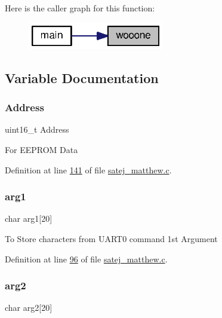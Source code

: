 Here is the caller graph for this function\+:
\nopagebreak
\begin{figure}[H]
\begin{center}
\leavevmode
\includegraphics[width=168pt]{satej__matthew_8c_a35d3aeb4661540f67e367e4e328c6c88_icgraph}
\end{center}
\end{figure}


\subsection{Variable Documentation}
\mbox{\label{satej__matthew_8c_a749532d9fcee171290bbfbe7859e6ba7}} 
\subsubsection{\texorpdfstring{Address}{Address}}
{\footnotesize\ttfamily uint16\+\_\+t Address}

For E\+E\+P\+R\+OM Data 

Definition at line \mbox{\hyperlink{satej__matthew_8c_source_l00141}{141}} of file \mbox{\hyperlink{satej__matthew_8c_source}{satej\+\_\+matthew.\+c}}.

\mbox{\label{satej__matthew_8c_accf689945fb0ed6303f1696f1171a053}} 
\subsubsection{\texorpdfstring{arg1}{arg1}}
{\footnotesize\ttfamily char arg1\mbox{[}20\mbox{]}}

To Store characters from U\+A\+R\+T0 command 1st Argument 

Definition at line \mbox{\hyperlink{satej__matthew_8c_source_l00096}{96}} of file \mbox{\hyperlink{satej__matthew_8c_source}{satej\+\_\+matthew.\+c}}.

\mbox{\label{satej__matthew_8c_a31707e8b8c984ef710bfa2b7f63b0760}} 
\subsubsection{\texorpdfstring{arg2}{arg2}}
{\footnotesize\ttfamily char arg2\mbox{[}20\mbox{]}}

